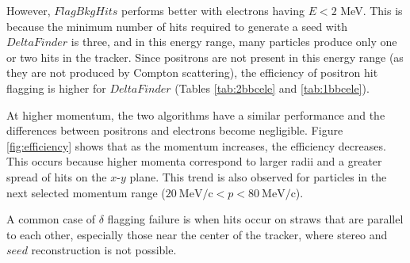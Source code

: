 However, $FlagBkgHits$ performs better with electrons having $E < 2$ MeV. 
This is because the minimum number of hits required to generate a 
seed with $DeltaFinder$ is three, and in this energy range, many 
particles produce only one or two hits in the tracker. Since positrons 
are not present in this energy range (as they are not produced by 
Compton scattering), the efficiency of positron hit flagging is 
higher for $DeltaFinder$ (Tables \ref{tab:2bbcele} and \ref{tab:1bbcele}).

At higher momentum, the two algorithms have a similar performance and the 
differences between positrons and electrons become negligible. 
Figure \ref{fig:efficiency} shows that as the momentum 
increases, the efficiency decreases. This occurs because 
higher momenta correspond to larger radii and a 
greater spread of hits on the $x$-$y$ plane. This trend is also observed for particles in the 
next selected momentum range ($20 \ \text{MeV/c} <p<80 \ \text{MeV/c}$).

A common case of $\delta$ flagging failure is when hits 
occur on straws that are parallel to each other, especially those near 
the center of the tracker, where stereo and $seed$ reconstruction is not possible. 

